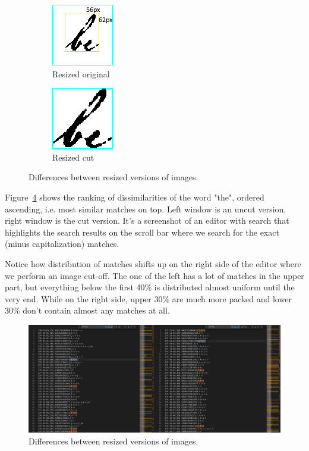 \documentclass[12pt]{article}
\begin{document}
\begin{figure}
     \centering
     \begin{subfigure}[b]{0.3\textwidth}
         \centering
         \includegraphics[scale=1.0]{figs/nocut_resize.png}
         \caption{Resized original}
         \label{fig:nocut_resize}
     \end{subfigure}
     \begin{subfigure}[b]{0.3\textwidth}
         \centering
         \includegraphics[scale=1.0]{figs/cut_resize.png}
         \caption{Resized cut}
         \label{fig:cut_resize}
     \end{subfigure}
        \caption{Differences between resized versions of images.}
        \label{fig:resized}
\end{figure}

Figure~\ref{fig:cutoff_ex} shows the ranking of dissimilarities of the word "the", ordered ascending, i.e. most similar matches on top. Left window is an uncut version, right window is the cut version. It's a screenshot of an editor with search that highlights the search results on the scroll bar where we search for the exact (minus capitalization) matches.

Notice how distribution of matches shifts up on the right side of the editor where we perform an image cut-off. The one of the left has a lot of matches in the upper part, but everything below the first 40\% is distributed almost uniform until the very end. While on the right side, upper 30\% are much more packed and lower 30\% don't contain almost any matches at all.

\begin{figure}
    \centering
    \includegraphics[scale=0.33]{figs/cutoff-ex.png}
    \caption{Differences between resized versions of images.}
    \label{fig:cutoff_ex}
\end{figure}
\end{document}
